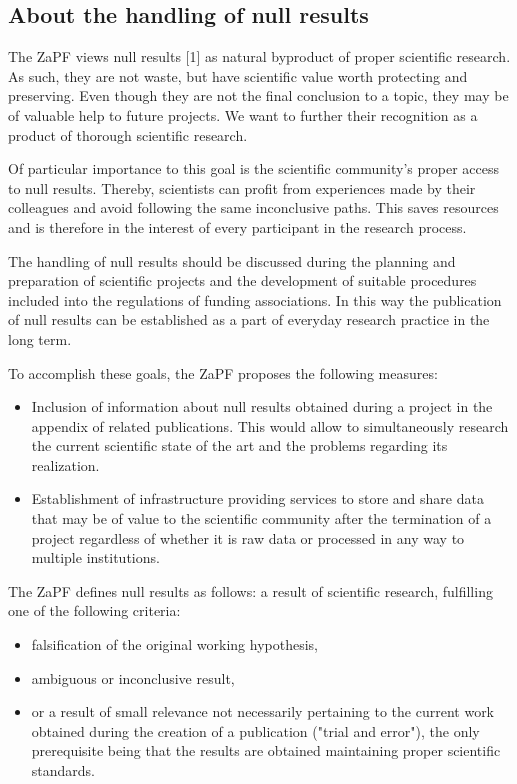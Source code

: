 
\subsection{About the handling of null results}
The ZaPF views null results [1] as natural byproduct of proper scientific research. As such, they are not waste, but have scientific value worth protecting and preserving. Even though they are not the final conclusion to a topic, they may be of valuable help to future projects. We want to further their recognition as a product of thorough scientific research.

Of particular importance to this goal is the scientific community's proper access to null results. Thereby, scientists can profit from experiences made by their colleagues and avoid following the same inconclusive paths. This saves resources and is therefore in the interest of every participant in the research process.

The handling of null results should be discussed during the planning and preparation of scientific projects and the development of suitable procedures included into the regulations of funding associations. In this way the publication of null results can be established as a part of everyday research practice in the long term.

To accomplish these goals, the ZaPF proposes the following measures:
\begin{itemize}
  \item Inclusion of information about null results obtained during a project in the appendix of related publications. This would allow to simultaneously research the current scientific state of the art and the problems regarding its realization.
  \item Establishment of infrastructure providing services to store and share data that may be of value to the scientific community after the termination of a project regardless of whether it is raw data or processed in any way to multiple institutions.
\end{itemize}
\newpage
[1] The ZaPF defines null results as follows: a result of scientific research, fulfilling one of the following criteria:
\begin{itemize}
  \item falsification of the original working hypothesis,
  \item ambiguous or inconclusive result,
  \item or a result of small relevance not necessarily pertaining to the current work obtained during the creation of a publication ("trial and error"),
    the only prerequisite being that the results are obtained maintaining proper scientific standards.
\end{itemize}
